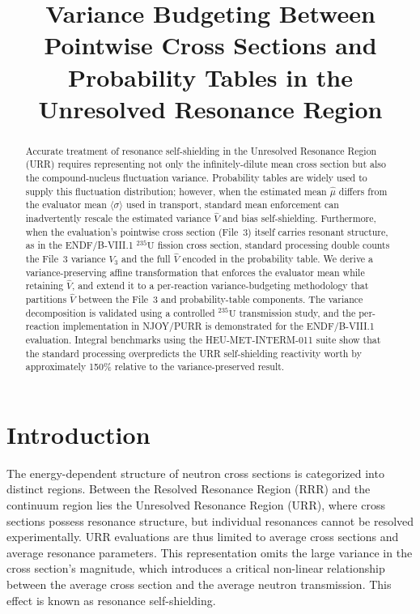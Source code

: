 \documentclass{style/nseJournal}
\title{Variance Budgeting Between Pointwise Cross Sections and Probability Tables in the Unresolved Resonance Region}
\newcommand{\isotope}[2]{\ensuremath{^{#1}\mathrm{#2}}}
\begin{document}
\titlePage

\begin{abstract}
Accurate treatment of resonance self-shielding in the Unresolved Resonance Region (URR) requires representing not only the infinitely-dilute mean cross section but also the compound-nucleus fluctuation variance. Probability tables are widely used to supply this fluctuation distribution; however, when the estimated mean $\hat{\mu}$ differs from the evaluator mean $\langle\sigma\rangle$ used in transport, standard mean enforcement can inadvertently rescale the estimated variance $\hat{V}$ and bias self-shielding. Furthermore, when the evaluation's pointwise cross section (File~3) itself carries resonant structure, as in the ENDF/B-VIII.1 \isotope{235}{U} fission cross section, standard processing double counts the File~3 variance $V_3$ and the full $\hat{V}$ encoded in the probability table. We derive a variance-preserving affine transformation that enforces the evaluator mean while retaining $\hat{V}$, and extend it to a per-reaction variance-budgeting methodology that partitions $\hat{V}$ between the File~3 and probability-table components. The variance decomposition is validated using a controlled \isotope{235}{U} transmission study, and the per-reaction implementation in NJOY/PURR is demonstrated for the ENDF/B-VIII.1 evaluation. Integral benchmarks using the HEU-MET-INTERM-011 suite show that the standard processing overpredicts the URR self-shielding reactivity worth by approximately 150\% relative to the variance-preserved result.

\end{abstract}

\section{Introduction}

The energy-dependent structure of neutron cross sections is categorized into distinct regions. Between the Resolved Resonance Region (RRR) and the continuum region lies the Unresolved Resonance Region (URR), where cross sections possess resonance structure, but individual resonances cannot be resolved experimentally. URR evaluations are thus limited to average cross sections and average resonance parameters. This representation omits the large variance in the cross section's magnitude, which introduces a critical non-linear relationship between the average cross section and the average neutron transmission. This effect is known as resonance self-shielding.
\end{document}
